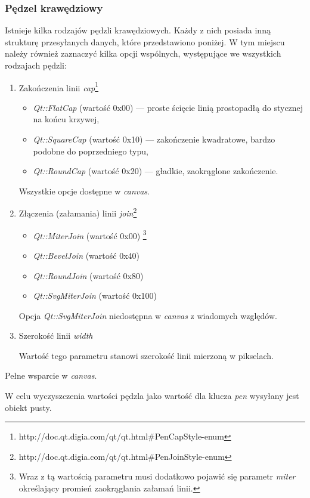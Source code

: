 \subsubsection{Pędzel krawędziowy}
Istnieje kilka rodzajów pędzli krawędziowych. Każdy z nich posiada inną strukturę przesyłanych danych, które przedstawiono poniżej. W tym miejscu należy również zaznaczyć kilka opcji wspólnych, występujące we wszystkich rodzajach pędzli:
\begin{enumerate}
\item Zakończenia linii \emph{cap}\footnote{http://doc.qt.digia.com/qt/qt.html\#PenCapStyle-enum}
\begin{itemize}
\item \emph{Qt::FlatCap} (wartość 0x00) --- proste ścięcie linią prostopadłą do stycznej na końcu krzywej,
\item \emph{Qt::SquareCap} (wartość 0x10) --- zakończenie kwadratowe, bardzo podobne do poprzedniego typu,
\item \emph{Qt::RoundCap} (wartość 0x20) --- gładkie, zaokrąglone zakończenie.
\end{itemize}
Wszystkie opcje dostępne w \emph{canvas}.

\item Złączenia (załamania) linii \emph{join}\footnote{http://doc.qt.digia.com/qt/qt.html\#PenJoinStyle-enum}
\begin{itemize}
\item \emph{Qt::MiterJoin} (wartość 0x00) \footnote{Wraz z tą wartością parametru musi dodatkowo pojawić się parametr \emph{miter} określający promień zaokrąglania załamań linii.}
\item \emph{Qt::BevelJoin} (wartość 0x40)
\item \emph{Qt::RoundJoin} (wartość 0x80)
\item \emph{Qt::SvgMiterJoin} (wartość 0x100)
\end{itemize}
Opcja \emph{Qt::SvgMiterJoin} niedostępna w \emph{canvas} z wiadomych względów.

\item Szerokość linii \emph{width}

Wartość tego parametru stanowi szerokość linii mierzoną w pikselach.
\end{enumerate}
Pełne wsparcie w \emph{canvas}.

W celu wyczyszczenia wartości pędzla jako wartość dla klucza \emph{pen} wysyłany jest obiekt pusty.

